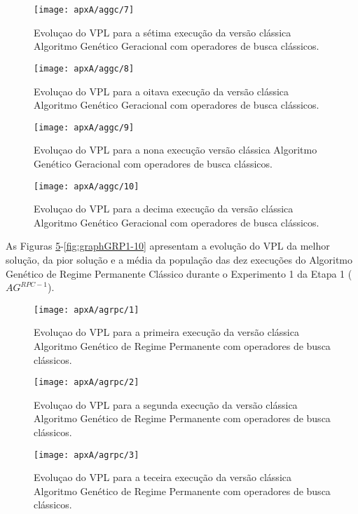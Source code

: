 \begin{figure}[H]
\centering
\texttt{[image: apxA/aggc/7]}
\caption{Evoluçao do VPL para a sétima execução da versão clássica Algoritmo Genético Geracional com operadores de busca clássicos.}
\label{fig:graphGC1-07}
\end{figure}

\begin{figure}[H]
\centering
\texttt{[image: apxA/aggc/8]}
\caption{Evoluçao do VPL para a oitava execução da versão clássica Algoritmo Genético Geracional com operadores de busca clássicos.}
\label{fig:graphGC1-08}
\end{figure}

\begin{figure}[H]
\centering
\texttt{[image: apxA/aggc/9]}
\caption{Evoluçao do VPL para a nona execução versão clássica Algoritmo Genético Geracional com operadores de busca clássicos.}
\label{fig:graphGC1-09}
\end{figure}

\begin{figure}[H]
\centering
\texttt{[image: apxA/aggc/10]}
\caption{Evoluçao do VPL para a decima execução da versão clássica Algoritmo Genético Geracional com operadores de busca clássicos.}
\label{fig:graphGC1-10}
\end{figure}

As Figuras \ref{fig:graphGRP1-01}-\ref{fig:graphGRP1-10} apresentam a evolução do VPL da melhor solução, da pior solução e a média da população das dez execuções do Algoritmo Genético de Regime Permanente Clássico durante o Experimento 1 da Etapa 1 ($AG^{RPC-1}$).

\begin{figure}[H]
\centering
\texttt{[image: apxA/agrpc/1]}
\caption{Evoluçao do VPL para a primeira execução da versão clássica Algoritmo Genético de Regime Permanente com operadores de busca clássicos.}
\label{fig:graphGRP1-01}
\end{figure}

\begin{figure}[H]
\centering
\texttt{[image: apxA/agrpc/2]}
\caption{Evoluçao do VPL para a segunda execução da versão clássica Algoritmo Genético de Regime Permanente com operadores de busca clássicos.}
\label{fig:graphGRP1-02}
\end{figure}

\begin{figure}[H]
\centering
\texttt{[image: apxA/agrpc/3]}
\caption{Evoluçao do VPL para a teceira execução da versão clássica Algoritmo Genético de Regime Permanente com operadores de busca clássicos.}
\label{fig:graphGRP1-03}
\end{figure}


